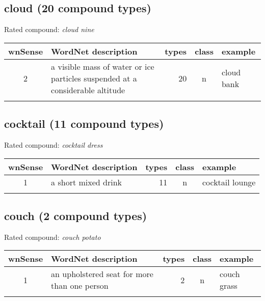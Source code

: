 \subsection{cloud        (20 compound types)}
Rated compound: \emph{cloud nine}

\vspace*{1ex}

\noindent
\begin{longtable}{c>{\raggedright\arraybackslash}p{5cm}rc>{\raggedright\arraybackslash}p{2cm}}\lsptoprule
{\small wnSense}&WordNet description&types&class&example\\\midrule
2&a visible mass of water or ice particles suspended at a considerable
altitude&20&n&cloud bank\\\lspbottomrule
\end{longtable}

\subsection{cocktail    (11 compound types)}
Rated compound: \emph{cocktail dress}


\vspace*{1ex}

\noindent
\begin{longtable}{c>{\raggedright\arraybackslash}p{5cm}rc>{\raggedright\arraybackslash}p{2cm}}\lsptoprule
{\small wnSense}&WordNet description&types&class&example\\\midrule
1&a short mixed drink&11&n&cocktail lounge\\\lspbottomrule
\end{longtable}

\subsection{couch        (2 compound types)}
Rated compound: \emph{couch potato}


\vspace*{1ex}

\noindent
\begin{longtable}{c>{\raggedright\arraybackslash}p{5cm}rc>{\raggedright\arraybackslash}p{2cm}}\lsptoprule
{\small wnSense}&WordNet description&types&class&example\\\midrule
1&an upholstered seat for more than one person&2&n&couch grass\\\lspbottomrule
\end{longtable}

